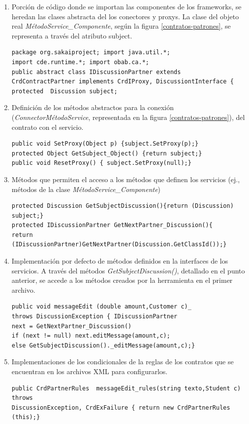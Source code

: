 \begin{enumerate}
\item Porción de código donde se importan las componentes de los frameworks, se
heredan las clases abstracta del los conectores y proxys. La clase del objeto
real \textit{MétodoService\_Componente}, según la figura
\ref{contratos-patrones}, se representa a través del atributo subject.

\small \begin{verbatim}
package org.sakaiproject; import java.util.*; 
import cde.runtime.*; import obab.ca.*;
public abstract class IDiscussionPartner extends 
CrdContractPartner implements CrdIProxy, DiscussiontInterface {
protected  Discussion subject;
\end{verbatim}\normalsize

\item Definición de los métodos abstractos para la conexión
(\textit{ConnectorMétodoService}, representada en la
figura \ref{contratos-patrones}), del contrato con el servicio.

\small \begin{verbatim}
public void SetProxy(Object p) {subject.SetProxy(p);}
protected Object GetSubject_Object() {return subject;}
public void ResetProxy() { subject.SetProxy(null);}
\end{verbatim}\normalsize


\item Métodos que permiten el acceso a los métodos que definen los servicios
(ej., métodos de la clase \textit{MétodoService_Componente})

\small \begin{verbatim}
protected Discussion GetSubjectDiscussion(){return (Discussion) subject;}
protected IDiscussionPartner GetNextPartner_Discussion(){
return (IDiscussionPartner)GetNextPartner(Discussion.GetClassId());}
\end{verbatim} \normalsize

\item Implementación por defecto de métodos definidos en la interfaces de los
servicios. A través del métodos \textit{GetSubjectDiscussion()}, detallado en el
punto anterior, se accede a los métodos creados por la herramienta en el primer
archivo.

\small \begin{verbatim}
public void messageEdit (double amount,Customer c)_
throws DiscussionException { IDiscussionPartner 
next = GetNextPartner_Discussion()
if (next != null) next.editMessage(amount,c); 
else GetSubjectDiscussion()._editMessage(amount,c);}
\end{verbatim} \normalsize

\item Implementaciones de los condicionales de la reglas de los contratos que se
encuentran en los archivos XML para configurarlos.

\small \begin{verbatim}
public CrdPartnerRules  messageEdit_rules(string texto,Student c) throws 
DiscussionException, CrdExFailure { return new CrdPartnerRules (this);}
\end{verbatim} \normalsize
\end{enumerate}


